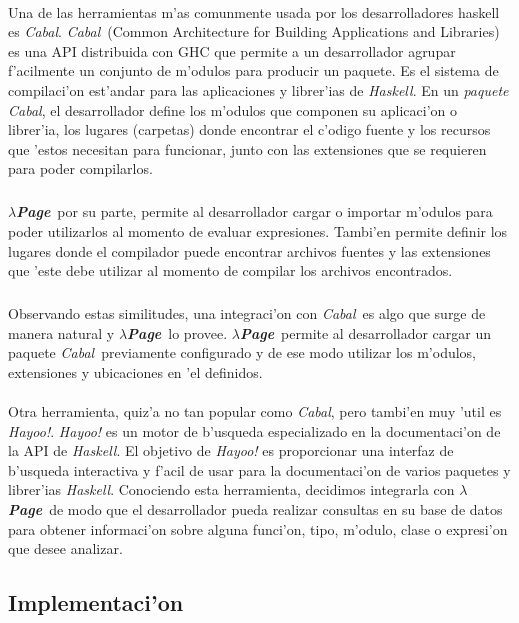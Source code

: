 \documentclass[a4paper]{article}
\newcommand{\haskell}{\textsl{Haskell}}
\newcommand{\hpage}{\textbf{\textsl{$\lambda$Page}}}
\newcommand{\cabal}{\textsl{Cabal}}
\begin{document}
\paragraph{}Una de las herramientas m'as comunmente usada por los desarrolladores haskell es \cabal.  \cabal\ (Common Architecture for Building Applications and Libraries) es una API distribuida con GHC que permite a un desarrollador agrupar f'acilmente un conjunto de m'odulos para producir un paquete. Es el sistema de compilaci'on est'andar para las aplicaciones y librer'ias de \haskell.  En un \textsl{paquete Cabal}, el desarrollador define los m'odulos que componen su aplicaci'on o librer'ia, los lugares (carpetas) donde encontrar el c'odigo fuente y los recursos que 'estos necesitan para funcionar, junto con las extensiones que se requieren para poder compilarlos.
\subparagraph{}\hpage\ por su parte, permite al desarrollador cargar o importar m'odulos para poder utilizarlos al momento de evaluar expresiones.  Tambi'en permite definir los lugares donde el compilador puede encontrar archivos fuentes y las extensiones que 'este debe utilizar al momento de compilar los archivos encontrados.
\subparagraph{}Observando estas similitudes, una integraci'on con \cabal\ es algo que surge de manera natural y \hpage\ lo provee.  \hpage\ permite al desarrollador cargar un paquete \cabal\ previamente configurado y de ese modo utilizar los m'odulos, extensiones y ubicaciones en 'el definidos.
\paragraph{}Otra herramienta, quiz'a no tan popular como \cabal, pero tambi'en muy 'util es \textsl{Hayoo!}.  \textsl{Hayoo!} es un motor de b'usqueda especializado en la documentaci'on de la API de \haskell.  El objetivo de \textsl{Hayoo!} es proporcionar una interfaz de b'usqueda interactiva y f'acil de usar para la documentaci'on de varios paquetes y librer'ias \haskell.  Conociendo esta herramienta, decidimos integrarla con \hpage\ de modo que el desarrollador pueda realizar consultas en su base de datos para obtener informaci'on sobre alguna funci'on, tipo, m'odulo, clase o expresi'on que desee analizar.

\subsection{Implementaci'on}
\begin{epigraphs}
\end{epigraphs}
\end{document}
